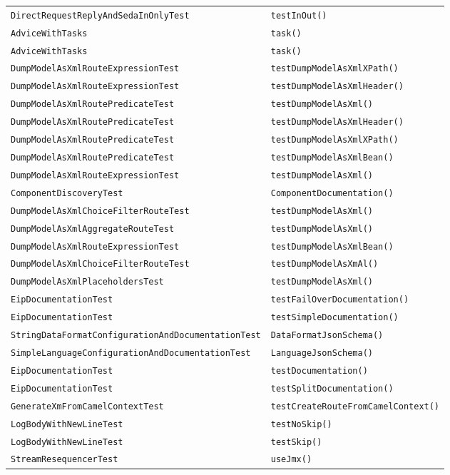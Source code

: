 \begin{center}
\begin{longtable}{ll}
\lstinline/DirectRequestReplyAndSedaInOnlyTest/&{\lstinline/testInOut()/}\\
\lstinline/AdviceWithTasks/&{\lstinline/task()/}\\
\lstinline/AdviceWithTasks/&{\lstinline/task()/}\\
\lstinline/DumpModelAsXmlRouteExpressionTest/&{\lstinline/testDumpModelAsXmlXPath()/}\\
\lstinline/DumpModelAsXmlRouteExpressionTest/&{\lstinline/testDumpModelAsXmlHeader()/}\\
\lstinline/DumpModelAsXmlRoutePredicateTest/&{\lstinline/testDumpModelAsXml()/}\\
\lstinline/DumpModelAsXmlRoutePredicateTest/&{\lstinline/testDumpModelAsXmlHeader()/}\\
\lstinline/DumpModelAsXmlRoutePredicateTest/&{\lstinline/testDumpModelAsXmlXPath()/}\\
\lstinline/DumpModelAsXmlRoutePredicateTest/&{\lstinline/testDumpModelAsXmlBean()/}\\
\lstinline/DumpModelAsXmlRouteExpressionTest/&{\lstinline/testDumpModelAsXml()/}\\
\lstinline/ComponentDiscoveryTest/&{\lstinline/ComponentDocumentation()/}\\
\lstinline/DumpModelAsXmlChoiceFilterRouteTest/&{\lstinline/testDumpModelAsXml()/}\\
\lstinline/DumpModelAsXmlAggregateRouteTest/&{\lstinline/testDumpModelAsXml()/}\\
\lstinline/DumpModelAsXmlRouteExpressionTest/&{\lstinline/testDumpModelAsXmlBean()/}\\
\lstinline/DumpModelAsXmlChoiceFilterRouteTest/&{\lstinline/testDumpModelAsXmAl()/}\\
\lstinline/DumpModelAsXmlPlaceholdersTest/&{\lstinline/testDumpModelAsXml()/}\\
\lstinline/EipDocumentationTest/&{\lstinline/testFailOverDocumentation()/}\\
\lstinline/EipDocumentationTest/&{\lstinline/testSimpleDocumentation()/}\\
\lstinline/StringDataFormatConfigurationAndDocumentationTest/&{\lstinline/DataFormatJsonSchema()/}\\
\lstinline/SimpleLanguageConfigurationAndDocumentationTest/&{\lstinline/LanguageJsonSchema()/}\\
\lstinline/EipDocumentationTest/&{\lstinline/testDocumentation()/}\\
\lstinline/EipDocumentationTest/&{\lstinline/testSplitDocumentation()/}\\
\lstinline/GenerateXmFromCamelContextTest/&{\lstinline/testCreateRouteFromCamelContext()/}\\
\lstinline/LogBodyWithNewLineTest/&{\lstinline/testNoSkip()/}\\
\lstinline/LogBodyWithNewLineTest/&{\lstinline/testSkip()/}\\
\lstinline/StreamResequencerTest/&{\lstinline/useJmx()/}\\
\end{longtable}
\end{center}

